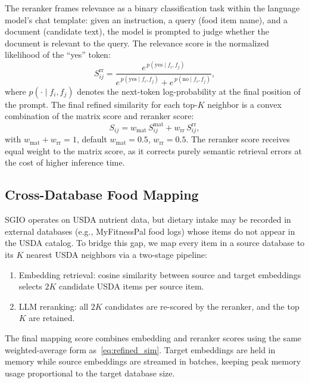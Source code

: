 \documentclass[journal]{IEEEtran}
\begin{document}
The reranker frames relevance as a binary classification task within the
language model's chat template: given an instruction, a query (food item
name), and a document (candidate text), the model is prompted to judge
whether the document is relevant to the query. The relevance score is
the normalized likelihood of the ``yes'' token:
\begin{equation}
S_{ij}^{\mathrm{rr}} = \frac{e^{\,p(\text{yes} \mid f_i, f_j)}}
{e^{\,p(\text{yes} \mid f_i, f_j)} + e^{\,p(\text{no} \mid f_i, f_j)}},
\label{eq:reranker_sim}
\end{equation}
where $p(\cdot \mid f_i, f_j)$ denotes the next-token log-probability
at the final position of the prompt. The final refined similarity for
each top-$K$ neighbor is a convex combination of the matrix score and
reranker score:
\begin{equation}
S_{ij} =
w_{\mathrm{mat}}\, S_{ij}^{\mathrm{mat}}
+ w_{\mathrm{rr}}\, S_{ij}^{\mathrm{rr}},
\label{eq:refined_sim}
\end{equation}
with $w_{\mathrm{mat}} + w_{\mathrm{rr}} = 1$, default
$w_{\mathrm{mat}} = 0.5$, $w_{\mathrm{rr}} = 0.5$. The reranker
score receives equal weight to the matrix score, as it corrects
purely semantic retrieval errors at the cost of higher inference time.

\subsection{Cross-Database Food Mapping}
\label{subsec:mapping}

SGIO operates on USDA nutrient data, but dietary intake may be recorded
in external databases (e.g., MyFitnessPal food logs) whose items do not
appear in the USDA catalog. To bridge this gap, we map every item in a
source database to its $K$ nearest USDA neighbors via a two-stage
pipeline:
\begin{enumerate}
\item Embedding retrieval: cosine similarity between source and target
  embeddings selects $2K$ candidate USDA items per source item.
\item LLM reranking: all $2K$ candidates are re-scored by the
  reranker, and the top $K$ are retained.
\end{enumerate}
The final mapping score combines embedding and reranker scores using the
same weighted-average form as~\eqref{eq:refined_sim}. Target embeddings
are held in memory while source embeddings are streamed in batches,
keeping peak memory usage proportional to the target database size.
\end{document}
